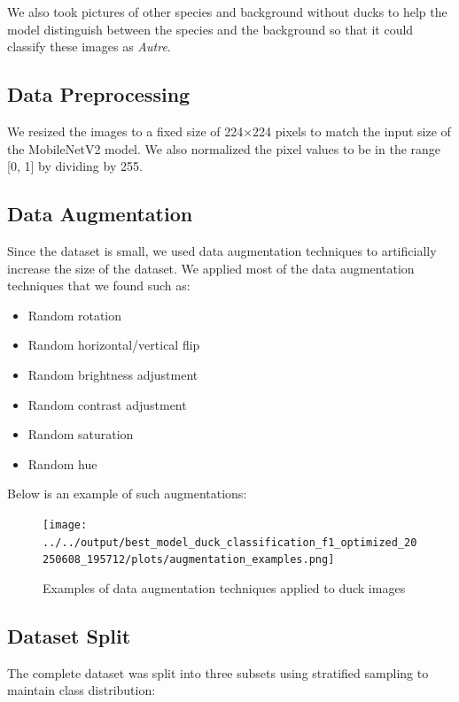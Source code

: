 \documentclass[12pt,a4paper]{article}
\begin{document}
We also took pictures of other species and background without ducks to help the model distinguish between the species and the background so that it could classify these images as \textit{Autre}.

\subsection{Data Preprocessing}

We resized the images to a fixed size of 224×224 pixels to match the input size of the MobileNetV2 model. We also normalized the pixel values to be in the range [0, 1] by dividing by 255.

\subsection{Data Augmentation}

Since the dataset is small, we used data augmentation techniques to artificially increase the size of the dataset. We applied most of the data augmentation techniques that we found such as:

\begin{itemize}
    \item Random rotation
    \item Random horizontal/vertical flip
    \item Random brightness adjustment
    \item Random contrast adjustment
    \item Random saturation
    \item Random hue
\end{itemize}

Below is an example of such augmentations:

\begin{figure}[H]
    \centering
    \texttt{[image: ../../output/best\_model\_duck\_classification\_f1\_optimized\_20250608\_195712/plots/augmentation\_examples.png]}
    \caption{Examples of data augmentation techniques applied to duck images}
    \label{fig:augmentation}
\end{figure}

\subsection{Dataset Split}

The complete dataset was split into three subsets using stratified sampling to maintain class distribution:
\end{document}
